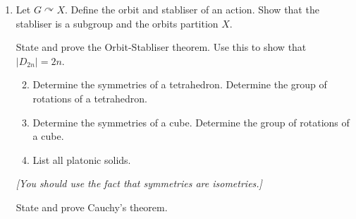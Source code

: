\documentclass{article}
\newlength{\qspace}
\newcounter{qnumber}
\newenvironment{question}%
 {\vspace{\qspace}
  \begin{enumerate}[\bfseries 1\quad][10]%
    \setcounter{enumi}{\value{qnumber}}%
    \item%
 }
{
  \end{enumerate}
  \filbreak
  \stepcounter{qnumber}
 }
\newenvironment{questionparts}[1][1]%
 {
  \begin{enumerate}[\bfseries (i)]%
    \setcounter{enumii}{#1}
    \addtocounter{enumii}{-1}
    \setlength{\parskip}{3pt}
 }
 {
  \end{enumerate}
 }
\begin{document}
\begin{question}
  Let $ G \curvearrowright X $. Define the orbit and stabliser of an action. Show that the stabliser is a subgroup and the orbits partition $X$.

  State and prove the Orbit-Stabliser theorem. Use this to show that $ |D_{2n}|=2n $.

  \begin{questionparts}
    \item Determine the symmetries of a tetrahedron. Determine the group of rotations of a tetrahedron.
    \item Determine the symmetries of a cube. Determine the group of rotations of a cube.
    \item List all platonic solids.
  \end{questionparts}
  \textit{[You should use the fact that symmetries are isometries.]}

  State and prove Cauchy's theorem.
\end{question}
\end{document}
